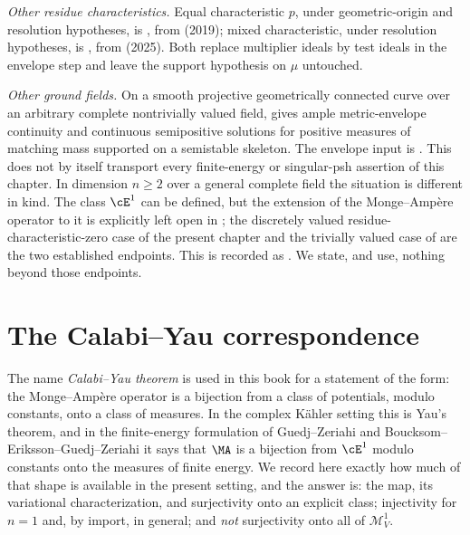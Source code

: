 \emph{Other residue characteristics.}  Equal characteristic $p$, under
geometric-origin and resolution hypotheses, is
, from \cite{GJKM19} (2019);
mixed characteristic, under resolution hypotheses, is
, from \cite{FGK25} (2025).  Both
replace multiplier ideals by test ideals in the envelope step and leave the
support hypothesis on $\mu$ untouched.

\emph{Other ground fields.}  On a smooth projective geometrically
connected curve over an arbitrary complete nontrivially valued field,
 gives ample metric-envelope
continuity and continuous semipositive solutions for positive measures of
matching mass supported on a semistable skeleton.  The envelope input is
\cite[Theorem~1.1]{GJKM19}.  This does not by itself transport every
finite-energy or singular-psh assertion of this chapter.
In dimension $n\geq2$ over a
general complete field the situation is different in kind.  The class
$\cE^1$ can be defined, but the extension of the Monge--Amp\`ere operator
to it is explicitly left open in \cite[Remark~4.4]{PS23Hybrid}; the
discretely valued residue-characteristic-zero case of the present chapter and
the trivially valued case of  are the two
established endpoints.  This is recorded as
.  We state, and use, nothing beyond those
endpoints.

\section{The Calabi--Yau correspondence}
\label{sec:ch28-calabi-yau}

The name \emph{Calabi--Yau theorem} is used in this book for a statement of
the form: the Monge--Amp\`ere operator is a bijection from a class of
potentials, modulo constants, onto a class of measures.  In the complex
K\"ahler setting this is Yau's theorem, and in the finite-energy formulation
of Guedj--Zeriahi and Boucksom--Eriksson--Guedj--Zeriahi it says that
$\MA$ is a bijection from $\cE^1$ modulo constants onto the measures of
finite energy.  We record here exactly how much of that shape is available in
the present setting, and the answer is: the map, its variational
characterization, and surjectivity onto an explicit class; injectivity for
$n=1$ and, by import, in general; and \emph{not} surjectivity onto all of
$\mathcal M^1_V$.

